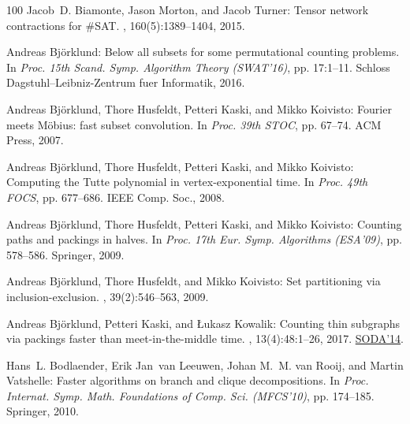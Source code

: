 \begin{thebibliography}{100}
{\sc Jacob~D. Biamonte, Jason Morton, and Jacob Turner}: Tensor network
  contractions for {\#}{SAT}.
, 160(5):1389--1404, 2015.

{\sc Andreas Bj{\"{o}}rklund}: Below all subsets for some permutational
  counting problems.
\newblock In {\em Proc. 15th Scand. Symp. Algorithm Theory (SWAT'16)}, pp.
  17:1--11. Schloss Dagstuhl--Leibniz-Zentrum fuer Informatik, 2016.

{\sc Andreas Bj{\"{o}}rklund, Thore Husfeldt, Petteri Kaski, and Mikko
  Koivisto}: Fourier meets {M}{\"{o}}bius: fast subset convolution.
\newblock In {\em Proc. 39th STOC}, pp. 67--74. ACM Press, 2007.

{\sc Andreas Bj{\"{o}}rklund, Thore Husfeldt, Petteri Kaski, and Mikko
  Koivisto}: Computing the {T}utte polynomial in vertex-exponential time.
\newblock In {\em Proc. 49th FOCS}, pp. 677--686. IEEE Comp. Soc., 2008.

{\sc Andreas Bj{\"{o}}rklund, Thore Husfeldt, Petteri Kaski, and Mikko
  Koivisto}: Counting paths and packings in halves.
\newblock In {\em Proc. 17th Eur. Symp. Algorithms (ESA'09)}, pp. 578--586.
  Springer, 2009.

{\sc Andreas Bj{\"{o}}rklund, Thore Husfeldt, and Mikko Koivisto}: Set
  partitioning via inclusion-exclusion.
, 39(2):546--563, 2009.
\newblock [\epfmtdoi{10.1137/070683933}]

{\sc Andreas Bj{\"{o}}rklund, Petteri Kaski, and {\L{}}ukasz Kowalik}: Counting
  thin subgraphs via packings faster than meet-in-the-middle time.
, 13(4):48:1--26, 2017.
\newblock \prelim \href{https://doi.org/10.1137/1.9781611973402.45}{SODA'14}.

{\sc Hans~L. Bodlaender, Erik Jan~van Leeuwen, Johan M.~M. van Rooij, and
  Martin Vatshelle}: Faster algorithms on branch and clique decompositions.
\newblock In {\em Proc. Internat. Symp. Math. Foundations of Comp. Sci.
  (MFCS'10)}, pp. 174--185. Springer, 2010.
\newblock [\epfmtdoi{10.1007/978-3-642-15155-2\_17}]


\end{thebibliography}
